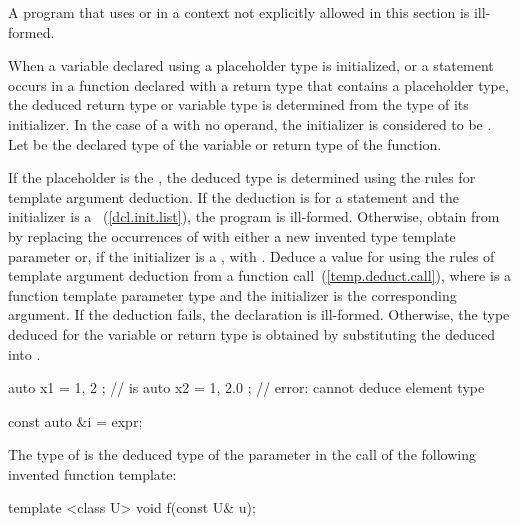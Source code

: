 \pnum
A program that uses  or  in a context not
explicitly allowed in this section is ill-formed.

\pnum
When a variable declared using a placeholder type is initialized, or a
 statement occurs in a function declared with a return type that
contains a placeholder type, the deduced return type or variable type is
determined from the type of its initializer. In the case of a 
with no operand, the initializer is considered to be .
Let  be the declared type of the variable or return type of the
function.

If the placeholder is the  , the
deduced type is determined using the rules for template argument deduction.
If the deduction is for a  statement and the initializer is a
~(\ref{dcl.init.list}), the program is
ill-formed. Otherwise, obtain  from
 by replacing the occurrences of  with either a new
invented type template parameter  or, if the initializer is a
, with
. Deduce a value for  using the rules
of template argument deduction from a function call~(\ref{temp.deduct.call}),
where  is a
function template parameter type and the initializer is the
corresponding argument. If the deduction fails, the declaration is ill-formed.
Otherwise, the type deduced for the variable or return type is obtained by
substituting the deduced  into .
\enterexample
\begin{codeblock}
auto x1 = { 1, 2 };         //  is 
auto x2 = { 1, 2.0 };       // error: cannot deduce element type
\end{codeblock}
\exitexample

\enterexample
\begin{codeblock}
const auto &i = expr;
\end{codeblock}

The type of  is the deduced type of the parameter  in
the call  of the following invented function template:

\begin{codeblock}
template <class U> void f(const U& u);
\end{codeblock}
\exitexample

